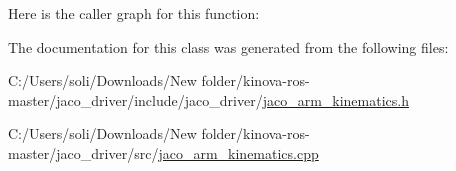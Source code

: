 Here is the caller graph for this function\+:




The documentation for this class was generated from the following files\+:\begin{DoxyCompactItemize}
\item 
C\+:/\+Users/soli/\+Downloads/\+New folder/kinova-\/ros-\/master/jaco\+\_\+driver/include/jaco\+\_\+driver/\hyperlink{jaco__arm__kinematics_8h}{jaco\+\_\+arm\+\_\+kinematics.\+h}\item 
C\+:/\+Users/soli/\+Downloads/\+New folder/kinova-\/ros-\/master/jaco\+\_\+driver/src/\hyperlink{jaco__arm__kinematics_8cpp}{jaco\+\_\+arm\+\_\+kinematics.\+cpp}\end{DoxyCompactItemize}
